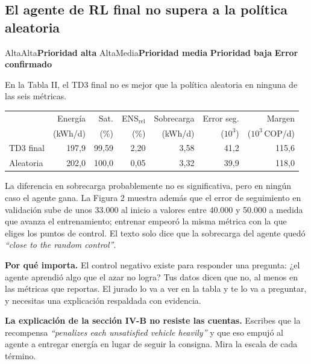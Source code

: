 \documentclass[11pt]{article}
\newcommand{\prioridad}[1]{%
  \def\tmpA{Alta}\def\tmpM{Media}\def\tmp{#1}%
  \ifx\tmp\tmpA\colorbox{rojoerror}{\color{white}\small\bfseries Prioridad alta}%
  \else\ifx\tmp\tmpM\colorbox{naranjatarea}{\color{white}\small\bfseries Prioridad media}%
  \else\colorbox{azulidea}{\color{white}\small\bfseries Prioridad baja}\fi\fi}
\newcommand{\confirmado}{\colorbox{rojoerror!15}{\small\bfseries\color{rojoerror} Error confirmado}}
\begin{document}
\subsection{El agente de RL final no supera a la política aleatoria}
\prioridad{Alta} \confirmado

\begin{error}
En la Tabla II, el TD3 final no es mejor que la política aleatoria en ninguna de las seis métricas.
\begin{center}
\small
\begin{tabular}{@{}lrrrrrr@{}}
\toprule
 & Energía & Sat. & ENS$_{\mathrm{rel}}$ & Sobrecarga & Error seg. & Margen \\
 & (kWh/d) & (\%) & (\%) & (kWh/d) & ($10^3$) & ($10^3$\,COP/d) \\
\midrule
TD3 final & 197,9 & 99,59 & 2,20 & 3,58 & 41,2 & 115,6 \\
Aleatoria & 202,0 & 100,0 & 0,05 & 3,32 & 39,9 & 118,0 \\
\bottomrule
\end{tabular}
\end{center}
La diferencia en sobrecarga probablemente no es significativa, pero en ningún caso el agente gana. La Figura 2 muestra además que el error de seguimiento en validación sube de unos 33.000 al inicio a valores entre 40.000 y 50.000 a medida que avanza el entrenamiento; entrenar empeoró la misma métrica con la que eliges los puntos de control. El texto solo dice que la sobrecarga del agente quedó \foreignlanguage{english}{\emph{``close to the random control''}}.
\end{error}

\textbf{Por qué importa.} El control negativo existe para responder una pregunta: ¿el agente aprendió algo que el azar no logra? Tus datos dicen que no, al menos en las métricas que reportas. El jurado lo va a ver en la tabla y te lo va a preguntar, y necesitas una explicación respaldada con evidencia.

\textbf{La explicación de la sección IV-B no resiste las cuentas.} Escribes que la recompensa \foreignlanguage{english}{\emph{``penalizes each unsatisfied vehicle heavily''}} y que eso empujó al agente a entregar energía en lugar de seguir la consigna. Mira la escala de cada término.
\end{document}
